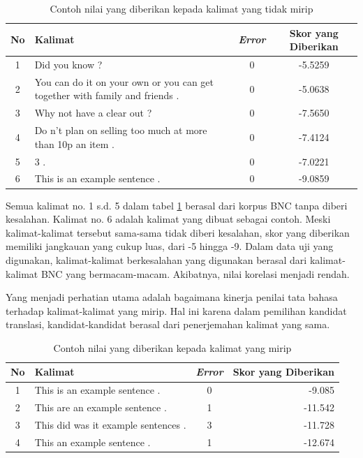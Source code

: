 \documentclass[conference]{IEEEtran}
\begin{document}
\begin{table}[h]
\caption{Contoh nilai yang diberikan kepada kalimat yang tidak mirip}
\begin{center}
\begin{tabular}{|c|p{4cm}|c|c|}
\hline
\textbf{No}&\textbf{Kalimat}&\textbf{\textit{Error}}&\textbf{Skor yang Diberikan}\\
\hline
1&Did you know ?&0&-5.5259\\
\hline
2&You can do it on your own or you can get together with family and friends . &0&-5.0638\\
\hline
3&Why not have a clear out ?&0&-7.5650\\
\hline
4&Do n't plan on selling too much at more than 10p an item .&0&-7.4124\\
\hline
5&3 .&0&-7.0221\\
\hline
6&This is an example sentence .&0&-9.0859\\
\hline

\end{tabular}
\label{tabeksperimenscoringnotsimilarexample}
\end{center}
\end{table}

Semua kalimat no. 1 s.d. 5 dalam tabel \ref{tabeksperimenscoringnotsimilarexample} berasal dari korpus BNC tanpa diberi kesalahan. Kalimat no. 6 adalah kalimat yang dibuat sebagai contoh. Meski kalimat-kalimat tersebut sama-sama tidak diberi kesalahan, skor yang diberikan memiliki jangkauan yang cukup luas, dari -5 hingga -9. Dalam data uji yang digunakan, kalimat-kalimat berkesalahan yang digunakan berasal dari kalimat-kalimat BNC yang bermacam-macam. Akibatnya, nilai korelasi menjadi rendah.

Yang menjadi perhatian utama adalah bagaimana kinerja penilai tata bahasa terhadap kalimat-kalimat yang mirip. Hal ini karena dalam pemilihan kandidat translasi, kandidat-kandidat berasal dari penerjemahan kalimat yang sama.


\begin{table}[h]
\caption{Contoh nilai yang diberikan kepada kalimat yang mirip}
\begin{center}
\begin{tabular}{|c|p{4cm}|c|r|}
\hline
\textbf{No}&\textbf{Kalimat}&\textbf{\textit{Error}}&\textbf{Skor yang Diberikan}\\
\hline
1&This is an example sentence .&0&-9.085\\
\hline
2&This are an example sentence . &1&-11.542\\
\hline
3&This did was it example sentences .&3&-11.728\\
\hline
4&This an example sentence .&1&-12.674\\
\hline

\end{tabular}
\label{tabeksperimenscoringsimilarexample}
\end{center}
\end{table}
\end{document}
